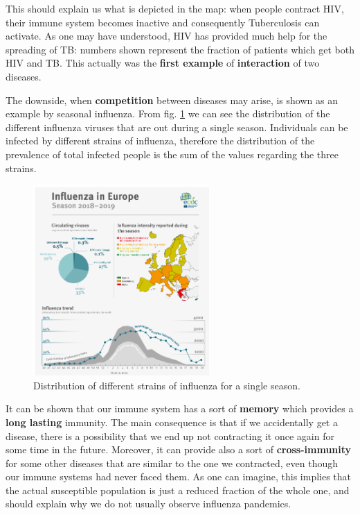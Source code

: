 \documentclass[../main/main.tex]{subfiles}
\begin{document}
This should explain us what is depicted in the map: when people contract HIV, their immune system becomes inactive and consequently Tuberculosis can activate. As one may have understood, HIV has provided much help for the spreading of TB: numbers shown represent the fraction of patients which get both HIV and TB. 
This actually was the \textbf{first example} of \textbf{interaction} of two diseases.


The downside, when \textbf{competition} between diseases may arise, is shown as an example by seasonal influenza. From fig. \ref{fig:11_002} we can see the distribution of the different influenza viruses that are out during a single season. Individuals can be infected by different strains of influenza, therefore the distribution of the prevalence of total infected people is the sum of the values regarding the three strains.

\begin{figure}[h!]
\centering
\includegraphics[width=0.6\textwidth]{../lessons/image/11/image002.png}
\caption{\label{fig:11_002} Distribution of different strains of influenza for a single season.}
\end{figure}

It can be shown that our immune system has a sort of \textbf{memory} which provides a \textbf{long lasting} immunity. The main consequence is that if we accidentally get a disease, there is a possibility that we end up not contracting it once again for some time in the future. Moreover, it can provide also a sort of \textbf{cross-immunity} for some other diseases that are similar to the one we contracted, even though our immune systems had never faced them. As one can imagine, this implies that the actual susceptible population is just a reduced fraction of the whole one, and should explain why we do not usually observe influenza pandemics.
\end{document}
